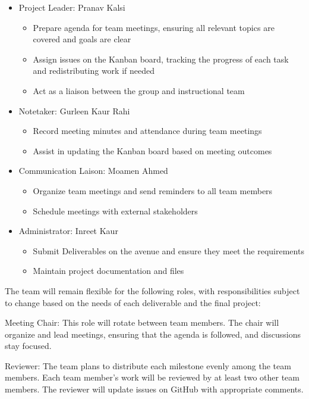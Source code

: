 \documentclass{article}
\begin{document}
\begin{itemize}
\item Project Leader: Pranav Kalsi
\begin{itemize}
\item Prepare agenda for team meetings, ensuring all relevant topics are covered and goals are clear
\item Assign issues on the Kanban board, tracking the progress of each task and redistributing work if needed
\item Act as a liaison between the group and instructional team
\end{itemize}

\item Notetaker: Gurleen Kaur Rahi
\begin{itemize}
\item Record meeting minutes and attendance during team meetings
\item Assist in updating the Kanban board based on meeting outcomes
\end{itemize}

\item Communication Laison: Moamen Ahmed
\begin{itemize}
\item Organize team meetings and send reminders to all team members
\item Schedule meetings with external stakeholders
\end{itemize}

\item Administrator: Inreet Kaur
\begin{itemize}
\item Submit Deliverables on the avenue and ensure they meet the requirements
\item Maintain project documentation and files
\end{itemize}
\end{itemize} 

The team will remain flexible for the following roles, with responsibilities subject to change based on the needs of each deliverable and the final project:

Meeting Chair: This role will rotate between team members. The chair will organize and lead meetings, ensuring that the agenda is followed, and discussions stay focused.

Reviewer: The team plans to distribute each milestone evenly among the team members. Each team member’s work will be reviewed by at least two other team members. The reviewer will update issues on GitHub with appropriate comments.
\end{document}

